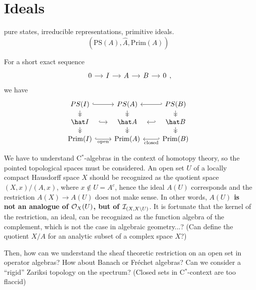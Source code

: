 \documentclass{../../large}
\newcommand{\Prim}{\operatorname{Prim}}
\begin{document}
\section{Ideals}

pure states, irreducible representations, primitive ideals.
\[(\mathrm{PS}(A),\hat A,\mathrm{Prim}(A))\]

For a short exact sequence
\[\begin{tikzcd}[column sep=small]0\rar&I\rar&A\rar&B\rar&0\end{tikzcd},\]
we have
\[\begin{tikzcd}[row sep=small]
PS(I) \dar[->>]\rar[hook] & PS(A) \dar[->>] & PS(B) \dar[->>]\lar[hook'] \\
\hat I \dar[->>]\rar[hook,shorten >= 10, shorten <= 10] & \hat A \dar[->>] & \hat B \dar[->>]\lar[hook',shorten >= 10, shorten <= 10] \\
\Prim(I) \rar[hook,swap]{\text{open}} & \Prim(A) & \Prim(B) \lar[hook']{\text{closed}}
\end{tikzcd}\]

We have to understand C$^*$-algebras in the context of homotopy theory, so the pointed topological spaces must be considered.
An open set $U$ of a locally compact Hausdorff space $X$ should be recognized as the quotient space $(X,x)/(A,x)$, where $x\notin U=A^c$, hence the ideal $A(U)$ corresponds and the restriction $A(X)\to A(U)$ does not make sense.
In other words, \textbf{$A(U)$ is not an analogue of $\mathcal{O}_X(U)$, but of $\mathcal{I}_{(X,X\setminus U)}$}.
It is fortunate that the kernel of the restriction, an ideal, can be recognized as the function algebra of the complement, which is not the case in algebraic geometry...? (Can define the quotient $X/A$ for an analytic subset of a complex space $X$?)

Then, how can we understand the sheaf theoretic restriction on an open set in operator algebras?
How about Banach or Fr\'echet algebras?
Can we consider a ``rigid'' Zariksi topology on the spectrum? (Closed sets in C$^*$-context are too flaccid)




\begin{prb}
\end{prb}
\end{document}
